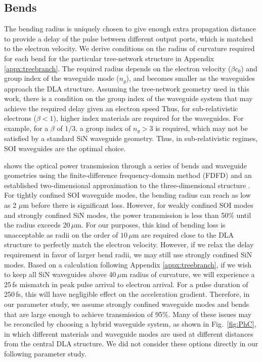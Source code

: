 \subsection{Bends}

The bending radius is uniquely chosen to give enough extra propagation distance to provide a delay of the pulse between different output ports, which is matched to the electron velocity.
We derive conditions on the radius of curvature required for each bend for the particular tree-network structure in Appendix \ref{appx:treebranch}.
The required radius depends on the electron velocity ($\beta c_0$) and group index of the waveguide mode ($n_g$), and becomes smaller as the waveguides approach the DLA structure.
Assuming the tree-network geometry used in this work, there is a condition on the group index of the waveguide system that may achieve the required delay given an electron speed
%
%
Thus, for sub-relativistic electrons ($\beta < 1$), higher index materials are required for the waveguides.
For example, for a $\beta$ of $1/3$, a group index of $n_g > 3$ is required, which may not be satisfied by a standard SiN waveguide geometry.
Thus, in sub-relativistic regimes, SOI waveguides are the optimal choice.


 shows the optical power transmission through a series of bends and waveguide geometries using the finite-difference frequency-domain method (FDFD) \cite{shin2012choice} and an established two-dimensional approximation to the three-dimensional structure \cite{smotrova2005cold}.
For tightly confined SOI waveguide modes, the bending radius can reach as low as 2 $\mu$m before there is significant loss.
However, for weakly confined SOI modes and strongly confined SiN modes, the power transmission is less than 50$\%$ until the radius exceeds 20\,$\mu$m.
For our purposes, this kind of bending loss is unacceptable as radii on the order of $10$\,$\mu$m are required close to the DLA structure to perfectly match the electron velocity.
However, if we relax the delay requirement in favor of larger bend radii, we may still use strongly confined SiN modes.
Based on a calculation following Appendix \ref{appx:treebranch}, if we wish to keep all SiN waveguides above 40\,$\mu$m radius of curvature, we will experience a 25\,fs mismatch in peak pulse arrival to electron arrival.
For a pulse duration of 250\,fs, this will have negligible effect on the acceleration gradient.
Therefore, in our parameter study, we assume strongly confined waveguide modes and bends that are large enough to achieve transmission of 95\%.
Many of these issues may be reconciled by choosing a hybrid waveguide system, as shown in Fig.~\ref{fig:PhC}, in which different materials and waveguide modes are used at different distances from the central DLA structure.
We did not consider these options directly in our following parameter study.

